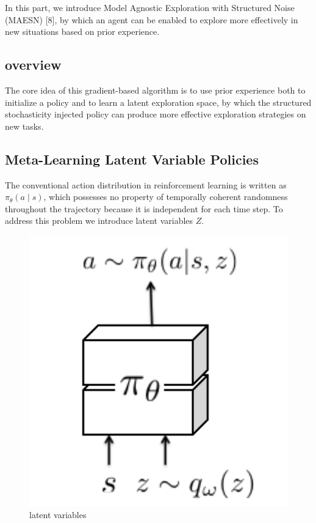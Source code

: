 In this part, we introduce Model Agnostic Exploration with Structured Noise (MAESN) [8], by which an agent can be enabled to explore more effectively in new situations based on prior experience.
\subsection{overview}

The core idea of this gradient-based algorithm is to use prior experience both to initialize a policy and to learn a latent exploration space, by which the structured stochasticity injected policy can produce more effective exploration strategies on new tasks.

\subsection{ Meta-Learning Latent Variable Policies}
The conventional action distribution in reinforcement learning is written as $\pi_{\theta}(a \mid s)$, which possesses no property of temporally coherent randomness throughout the trajectory because it is independent for each time step. To address this problem we introduce latent variables $Z$. 
\begin{figure}[H]
	\includegraphics[scale=0.3]{MAESN_01.PNG}
	\centering
	\caption{latent variables}
	\label{MAESN}
\end{figure}


